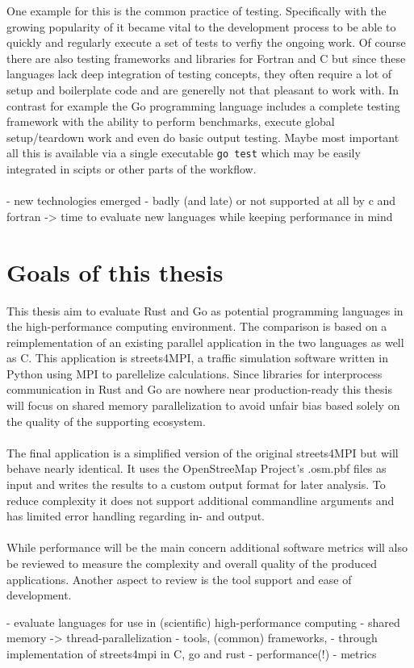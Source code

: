 One example for this is the common practice of testing. Specifically with the growing popularity of  it became vital to the development process to be able to quickly and regularly execute a set of tests to verfiy the ongoing work. Of course there are also testing frameworks and libraries for Fortran and C but since these languages lack deep integration of testing concepts, they often require a lot of setup and boilerplate code and are generelly not that pleasant to work with. In contrast for example the Go programming language includes a complete testing framework with the ability to perform benchmarks, execute global setup/teardown work and even do basic output testing.\cite{GO_TEST} Maybe most important all this is available via a single executable \lstinline$go test$ which may be easily integrated in scipts or other parts of the workflow.
\\ \\


- new technologies emerged
    - badly (and late) or not supported at all by c and fortran
    -> time to evaluate new languages while keeping performance in mind

\section{Goals of this thesis}
\label{sec:Goals}

This thesis aim to evaluate Rust and Go as potential programming languages in the high-performance computing environment. The comparison is based on a reimplementation of an existing parallel application in the two languages as well as C. This application is streets4MPI, a traffic simulation software written in Python using MPI to parellelize calculations. Since libraries for interprocess communication in Rust and Go are nowhere near production-ready this thesis will focus on shared memory parallelization to avoid unfair bias based solely on the quality of the supporting ecosystem.
\\ \\
The final application is a simplified version of the original streets4MPI but will behave nearly identical. It uses the OpenStreeMap Project's .osm.pbf files as input and writes the results to a custom output format for later analysis. To reduce complexity it does not support additional commandline arguments and has limited error handling regarding in- and output.
\\ \\
While performance will be the main concern additional software metrics will also be reviewed to measure the complexity and overall quality of the produced applications. Another aspect to review is the tool support and ease of development.

- evaluate languages for use in (scientific) high-performance computing
    - shared memory -> thread-parallelization
    - tools, (common) frameworks,
- through implementation of streets4mpi in C, go and rust
    - performance(!)
    - metrics
